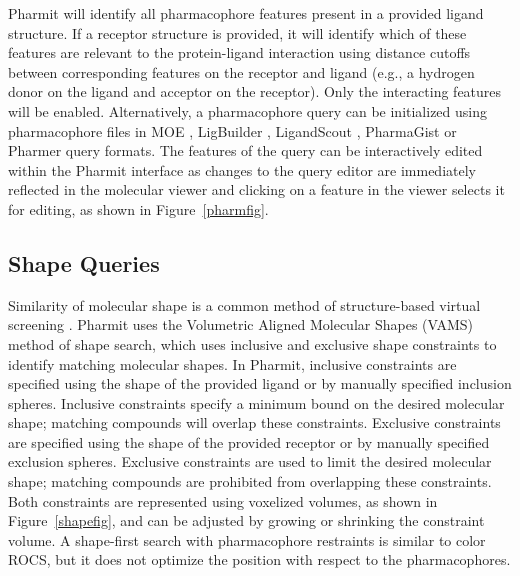 Pharmit will identify all pharmacophore features present in a provided ligand structure. If a receptor structure is provided, it will identify which of these features are relevant to the protein-ligand interaction using distance cutoffs between corresponding features on the receptor and ligand (e.g., a hydrogen donor on the ligand and acceptor on the receptor). Only the interacting features will be enabled. Alternatively, a pharmacophore query can be initialized using pharmacophore files in MOE \cite{moe}, LigBuilder \cite{Wang_2000}, LigandScout \cite{Wolber_2005}, PharmaGist \cite{Schneidman_Duhovny_2008} or Pharmer \cite{Koes_2011} query formats.  The features of the query can be interactively edited within the Pharmit interface as changes to the query editor are immediately reflected in the molecular viewer and clicking on a feature in the viewer selects it for editing, as shown in Figure~\ref{pharmfig}.

\subsection{Shape Queries}

Similarity of molecular shape is a common method of structure-based virtual screening \cite{Nicholls_2010}.  Pharmit uses the Volumetric Aligned Molecular Shapes (VAMS) \cite{vams} method of shape search, which uses inclusive and exclusive shape constraints to identify matching molecular shapes.  In Pharmit, inclusive constraints are specified using the shape of the provided ligand or by manually specified inclusion spheres. Inclusive constraints specify a minimum bound on the desired molecular shape; matching compounds will overlap these constraints. Exclusive constraints are specified using the shape of the provided receptor or by manually specified exclusion spheres.  Exclusive constraints are used to limit the desired molecular shape; matching compounds are prohibited from overlapping these constraints.  Both constraints are represented using voxelized volumes, as shown in Figure~\ref{shapefig}, and can be adjusted by growing or shrinking the constraint volume. A shape-first search with pharmacophore restraints is similar to color ROCS, but it does not optimize the position with respect to the pharmacophores.


